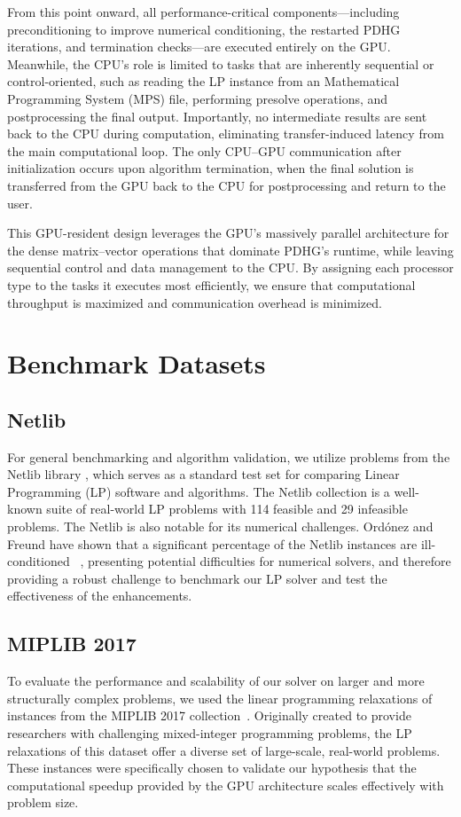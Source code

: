 \documentclass[twoside,12pt,openright]{report}  %
\begin{document}
From this point onward, all performance-critical components—including preconditioning to improve numerical conditioning, the restarted PDHG iterations, and termination checks—are executed entirely on the GPU. Meanwhile, the CPU’s role is limited to tasks that are inherently sequential or control-oriented, such as reading the LP instance from an Mathematical Programming System (MPS) file, performing presolve operations, and postprocessing the final output. Importantly, no intermediate results are sent back to the CPU during computation, eliminating transfer-induced latency from the main computational loop. The only CPU–GPU communication after initialization occurs upon algorithm termination, when the final solution is transferred from the GPU back to the CPU for postprocessing and return to the user.

This GPU-resident design leverages the GPU’s massively parallel architecture for the dense matrix–vector operations that dominate PDHG’s runtime, while leaving sequential control and data management to the CPU. By assigning each processor type to the tasks it executes most efficiently, we ensure that computational throughput is maximized and communication overhead is minimized.\\

\section{Benchmark Datasets}
\subsection{Netlib}\label{sec:Netlib}
For general benchmarking and algorithm validation, we utilize problems from the Netlib library \cite{Netlib}, which serves as a standard test set for comparing Linear Programming (LP) software and algorithms. The Netlib collection is a well-known suite of real-world LP problems with 114 feasible and 29 infeasible problems. The Netlib is also notable for its numerical challenges. Ordónez and Freund have shown that a significant percentage of the Netlib instances are ill-conditioned~\cite{ordonez2003computational} , presenting potential difficulties for numerical solvers, and therefore providing a robust challenge to benchmark our LP solver and test the effectiveness of the enhancements.
\subsection{MIPLIB 2017}
To evaluate the performance and scalability of our solver on larger and more structurally complex problems, we used the linear programming relaxations of instances from the MIPLIB 2017 collection~\cite{miplib2017}. Originally created to provide researchers with challenging mixed-integer programming problems, the LP relaxations of this dataset offer a diverse set of large-scale, real-world problems. These instances were specifically chosen to validate our hypothesis that the computational speedup provided by the GPU architecture scales effectively with problem size.
\end{document}
